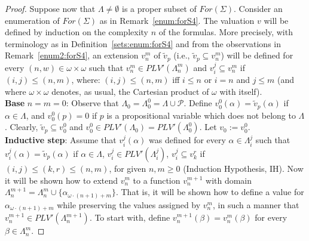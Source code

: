 \documentclass[12pt]{article}
\begin{document}
\begin{proof}
Suppose now that $\Lambda \neq \emptyset $ is a proper subset of $For(\Sigma)$.
Consider  an enumeration of $For(\Sigma)$ as in Remark~\ref{enum:forS4}.
The valuation $v$ will be defined by induction on the complexity $n$ of the formulas. 
More precisely, with terminology as in Definition~\ref{sets:enum:forS4} and from the observations in Remark~\ref{enum2:forS4}, an extension $v_n^m$ of $\tilde v_p$ (i.e.,  $\tilde v_p \subseteq v_n^m$) will be defined for every $(n,w) \in \omega\times \omega$ such that $v_n^m \in PLV'({\Lambda}_n^m)$ and $v_i^j \subseteq v_n^{m}$ if $(i,j) \leq (n,m)$, where: $(i,j) \leq (n,m)$ iff $i \leq n$ or $i=n$ and $j \leq m$ (and where $\omega \times \omega$ denotes, as usual, the Cartesian product of $\omega$ with itself). \\[1mm]
%
{\bf Base} $n=m=0$: Observe that ${\Lambda}_0={\Lambda}_0^0=\Lambda \cup \mathcal{P}$.
Define $v_0^0(\alpha)= \tilde v_p(\alpha)$ if $\alpha \in \Lambda$, and $v_0^0(p)=0$ if $p$ is a propositional variable which does not belong to $\Lambda$. Clearly, $\tilde v_p \subseteq v_0^0$ and $v_0^0 \in PLV'({\Lambda}_0)=PLV'({\Lambda}_0^0)$. Let $v_0:=v_0^0$.\\[1mm]
%
{\bf Inductive step}: Assume that $v_i^j(\alpha)$ was defined for every $\alpha \in {\Lambda}_i^j$ such that  $v_i^j(\alpha)= \tilde v_p(\alpha)$ if $\alpha \in \Lambda$, $v_i^j \in PLV'({\Lambda}_i^j)$, $v_i^j \subseteq v_k^r$ if $(i,j) \leq (k,r) \leq (n,m)$, for given $n,m \geq 0$ (Induction Hypothesis, IH). Now it will be shown how to extend $v_n^m$ to a function $v_n^{m+1}$ with domain ${\Lambda}_n^{m+1}={\Lambda}_n^m \cup \{\alpha_{\omega\cdot (n+1) +m}\}$. That is, it will be shown how to define a value for $\alpha_{\omega\cdot (n+1) +m}$ while preserving the values assigned by $v_n^m$, in such a manner that $v_n^{m+1}\in PLV'({\Lambda}_n^{m+1})$. To start with, define $v_n^{m+1}(\beta)=v_n^m(\beta)$ for every $\beta \in {\Lambda}_n^m$.


\end{proof}
\end{document}
